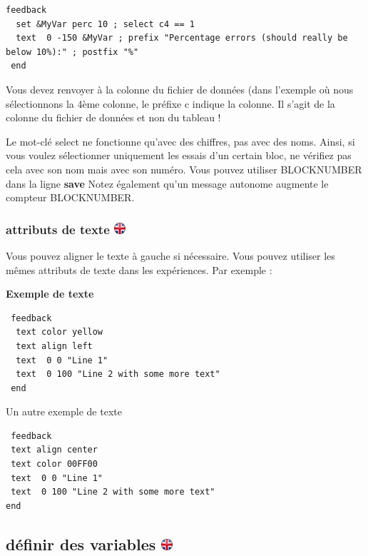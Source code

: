 \documentclass[
]{book}
\begin{document}
\begin{verbatim}
feedback
  set &MyVar perc 10 ; select c4 == 1
  text  0 -150 &MyVar ; prefix "Percentage errors (should really be below 10%):" ; postfix "%"
 end
\end{verbatim}

Vous devez renvoyer à la colonne du fichier de données (dans l'exemple
où nous sélectionnons la 4ème colonne, le préfixe c indique la colonne.
Il s'agit de la colonne du fichier de données et non du tableau !

Le mot-clé select ne fonctionne qu'avec des chiffres, pas avec des noms.
Ainsi, si vous voulez sélectionner uniquement les essais d'un certain
bloc, ne vérifiez pas cela avec son nom mais avec son numéro. Vous
pouvez utiliser BLOCKNUMBER dans la ligne \textbf{save} Notez également
qu'un message autonome augmente le compteur BLOCKNUMBER.

\hypertarget{attributs-de-texte}{%
\subsubsection[attributs de texte ]{\texorpdfstring{attributs de texte
\href{https://www.psytoolkit.org/doc3.1.0/feedback.html\#_text_attributes}{\protect\includegraphics{img/ukflag.png}}}{attributs de texte }}\label{attributs-de-texte}}

Vous pouvez aligner le texte à gauche si nécessaire. Vous pouvez
utiliser les mêmes attributs de texte dans les expériences. Par exemple
:

\textbf{Exemple de texte}

\begin{verbatim}
 feedback
  text color yellow
  text align left
  text  0 0 "Line 1"
  text  0 100 "Line 2 with some more text"
 end
\end{verbatim}

Un autre exemple de texte

\begin{verbatim}
 feedback
 text align center
 text color 00FF00
 text  0 0 "Line 1"
 text  0 100 "Line 2 with some more text"
end
\end{verbatim}

\hypertarget{duxe9finir-des-variables}{%
\subsection[définir des variables ]{\texorpdfstring{définir des
variables
\href{https://www.psytoolkit.org/doc3.1.0/feedback.html\#_set}{\protect\includegraphics{img/ukflag.png}}}{définir des variables }}\label{duxe9finir-des-variables}}
\end{document}
